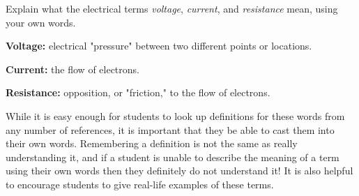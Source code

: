 

Explain what the electrical terms {\it voltage}, {\it current}, and {\it resistance} mean, using your own words.







{\bf Voltage:} electrical "pressure" between two different points or locations.

{\bf Current:} the flow of electrons.

{\bf Resistance:} opposition, or "friction," to the flow of electrons.







While it is easy enough for students to look up definitions for these words from any number of references, it is important that they be able to cast them into their own words.  Remembering a definition is not the same as really understanding it, and if a student is unable to describe the meaning of a term using their own words then they definitely do not understand it!  It is also helpful to encourage students to give real-life examples of these terms.




